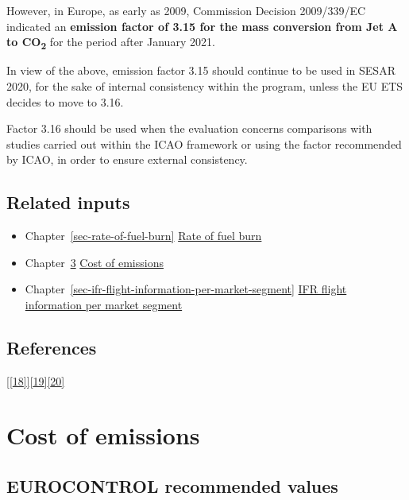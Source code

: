 \documentclass[
  11pt,
  a4paper,
]{book}
\begin{document}
However, in Europe, as early as 2009, Commission Decision 2009/339/EC
indicated an \textbf{emission factor of 3.15 for the mass conversion
from Jet A to CO\textsubscript{2}} for the period after January 2021.

In view of the above, emission factor 3.15 should continue to be used in
SESAR 2020, for the sake of internal consistency within the program,
unless the EU ETS decides to move to 3.16.

Factor 3.16 should be used when the evaluation concerns comparisons with
studies carried out within the ICAO framework or using the factor
recommended by ICAO, in order to ensure external consistency.

\hypertarget{related-inputs-5}{%
\section{Related inputs}\label{related-inputs-5}}

\begin{itemize}
\item
  Chapter~\ref{sec-rate-of-fuel-burn}
  \protect\hyperlink{sec-rate-of-fuel-burn}{Rate of fuel burn}
\item
  Chapter~\ref{sec-cost-of-emissions}
  \protect\hyperlink{sec-cost-of-emissions}{Cost of emissions}
\item
  Chapter~\ref{sec-ifr-flight-information-per-market-segment}
  \protect\hyperlink{sec-ifr-flight-information-per-market-segment}{IFR
  flight information per market segment}
\end{itemize}

\hypertarget{references-6}{%
\section{References}\label{references-6}}

{[}\protect\hyperlink{ref-eaer2022}{{[}18{]}}{]}\protect\hyperlink{ref-eea:2019}{{[}19{]}}\protect\hyperlink{ref-easaICAOAircraftEngine}{{[}20{]}}

\hypertarget{sec-cost-of-emissions}{%
\chapter{Cost of emissions}\label{sec-cost-of-emissions}}

\hypertarget{eurocontrol-recommended-values-4}{%
\section{EUROCONTROL recommended
values}\label{eurocontrol-recommended-values-4}}
\end{document}

